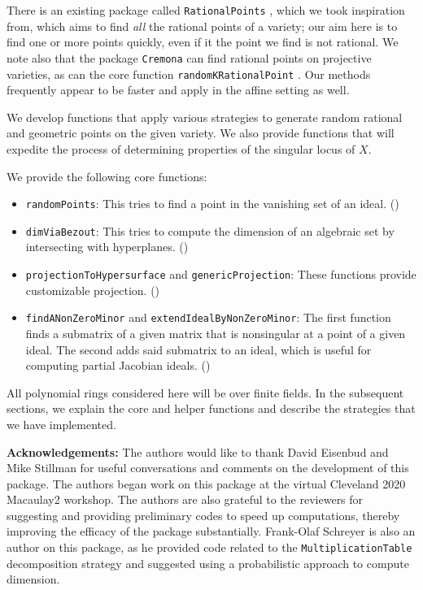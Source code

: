 \documentclass[11pt]{amsart}
\theoremstyle{definition}
\begin{document}
    There is an existing package called {\tt RationalPoints} \cite{RationalPointsSource}, which we took inspiration from, which aims to find \emph{all} the rational points of a variety; our aim here is to find one or more points quickly, even if it the point we find is not rational.  We note also that the package {\tt Cremona} \cite{CremonaSource} can find rational points on projective varieties, as can the core function {\tt randomKRationalPoint} \cite{M2}.  Our methods frequently appear to be faster and apply in the affine setting as well.

    We develop functions that apply various strategies to generate random rational and geometric points on the given variety. We also provide functions that will expedite the process of determining properties of the singular locus of $X$.%

    We provide the following core functions:
    \begin{itemize}    
    \item {\tt randomPoints}:  This tries to find a point in the vanishing set of an ideal. ()
    \item {\tt dimViaBezout}:  This tries to compute the dimension of an algebraic set by intersecting with hyperplanes.  ()
    \item {\tt projectionToHypersurface} and {\tt genericProjection}: These functions provide customizable projection. () 	
    \item {\tt findANonZeroMinor} and {\tt extendIdealByNonZeroMinor}:  The first function finds a submatrix of a given matrix that is nonsingular at a point of a given ideal.  The second adds said submatrix to an ideal, which is useful for computing partial Jacobian ideals.  ()          
    \end{itemize}

    All polynomial rings considered here will be over finite fields. In the subsequent sections, we explain  the core and helper functions and describe the strategies that we have implemented.

   \vspace{1em}
    \noindent \textbf{Acknowledgements:} The authors would like to thank David Eisenbud and Mike Stillman for useful conversations and comments on the development of this package.  The authors began work on this package at the virtual Cleveland 2020 Macaulay2 workshop. The authors are also grateful to the reviewers for suggesting and providing preliminary codes to speed up computations, thereby improving the efficacy of the package substantially.  Frank-Olaf Schreyer is also an author on this package, as he provided code related to the {\tt MultiplicationTable} decomposition strategy and suggested using a probabilistic approach to compute dimension.
\end{document}
